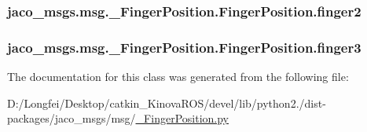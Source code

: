 \subsubsection[{\texorpdfstring{finger2}{finger2}}]{\setlength{\rightskip}{0pt plus 5cm}jaco\+\_\+msgs.\+msg.\+\_\+\+Finger\+Position.\+Finger\+Position.\+finger2}\hypertarget{classjaco__msgs_1_1msg_1_1__FingerPosition_1_1FingerPosition_a1d275302f5906a117122394553b0d533}{}\label{classjaco__msgs_1_1msg_1_1__FingerPosition_1_1FingerPosition_a1d275302f5906a117122394553b0d533}
\subsubsection[{\texorpdfstring{finger3}{finger3}}]{\setlength{\rightskip}{0pt plus 5cm}jaco\+\_\+msgs.\+msg.\+\_\+\+Finger\+Position.\+Finger\+Position.\+finger3}\hypertarget{classjaco__msgs_1_1msg_1_1__FingerPosition_1_1FingerPosition_ae22eef5355a658212ddb6b748780e72f}{}\label{classjaco__msgs_1_1msg_1_1__FingerPosition_1_1FingerPosition_ae22eef5355a658212ddb6b748780e72f}


The documentation for this class was generated from the following file\+:\begin{DoxyCompactItemize}
\item 
D\+:/\+Longfei/\+Desktop/catkin\+\_\+\+Kinova\+R\+O\+S/devel/lib/python2./dist-\/packages/jaco\+\_\+msgs/msg/\hyperlink{__FingerPosition_8py}{\+\_\+\+Finger\+Position.\+py}\end{DoxyCompactItemize}
